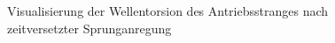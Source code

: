 \begin{figure}[H]
   \centering
   \caption[Wellentorsion Antriebsstrang]{Visualisierung der Wellentorsion des Antriebsstranges nach zeitversetzter Sprunganregung}
   \label{fig:Bild4.5}
\end{figure}